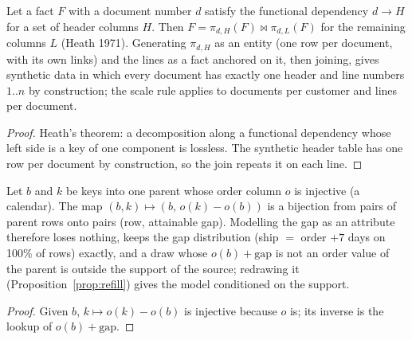 \begin{proposition}\label{prop:header}
Let a fact $F$ with a document number $d$ satisfy the functional dependency $d\to H$ for a set of header columns $H$. Then $F=\pi_{d,H}(F)\bowtie\pi_{d,L}(F)$ for the remaining columns $L$ (Heath 1971). Generating $\pi_{d,H}$ as an entity (one row per document, with its own links) and the lines as a fact anchored on it, then joining, gives synthetic data in which every document has exactly one header and line numbers $1..n$ by construction; the scale rule applies to documents per customer and lines per document.
\end{proposition}
\begin{proof}
Heath's theorem: a decomposition along a functional dependency whose left side is a key of one component is lossless. The synthetic header table has one row per document by construction, so the join repeats it on each line.
\end{proof}

\begin{proposition}\label{prop:offset}
Let $b$ and $k$ be keys into one parent whose order column $o$ is injective (a calendar). The map $(b,k)\mapsto(b,\,o(k)-o(b))$ is a bijection from pairs of parent rows onto pairs (row, attainable gap). Modelling the gap as an attribute therefore loses nothing, keeps the gap distribution (ship $=$ order $+7$ days on 100\% of rows) exactly, and a draw whose $o(b)+\text{gap}$ is not an order value of the parent is outside the support of the source; redrawing it (Proposition~\ref{prop:refill}) gives the model conditioned on the support.
\end{proposition}
\begin{proof}
Given $b$, $k\mapsto o(k)-o(b)$ is injective because $o$ is; its inverse is the lookup of $o(b)+\text{gap}$.
\end{proof}

